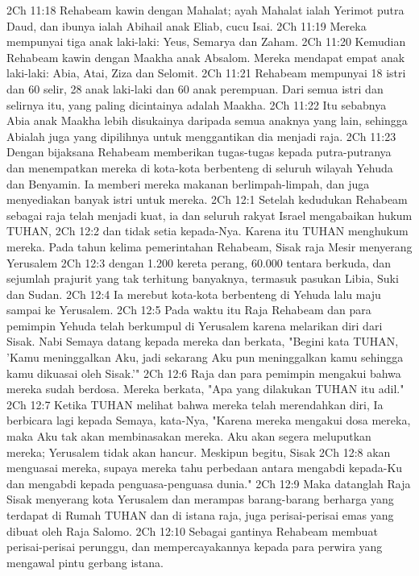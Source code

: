 2Ch 11:18  Rehabeam kawin dengan Mahalat; ayah Mahalat ialah Yerimot putra Daud, dan ibunya ialah Abihail anak Eliab, cucu Isai.
2Ch 11:19  Mereka mempunyai tiga anak laki-laki: Yeus, Semarya dan Zaham.
2Ch 11:20  Kemudian Rehabeam kawin dengan Maakha anak Absalom. Mereka mendapat empat anak laki-laki: Abia, Atai, Ziza dan Selomit.
2Ch 11:21  Rehabeam mempunyai 18 istri dan 60 selir, 28 anak laki-laki dan 60 anak perempuan. Dari semua istri dan selirnya itu, yang paling dicintainya adalah Maakha.
2Ch 11:22  Itu sebabnya Abia anak Maakha lebih disukainya daripada semua anaknya yang lain, sehingga Abialah juga yang dipilihnya untuk menggantikan dia menjadi raja.
2Ch 11:23  Dengan bijaksana Rehabeam memberikan tugas-tugas kepada putra-putranya dan menempatkan mereka di kota-kota berbenteng di seluruh wilayah Yehuda dan Benyamin. Ia memberi mereka makanan berlimpah-limpah, dan juga menyediakan banyak istri untuk mereka.
2Ch 12:1  Setelah kedudukan Rehabeam sebagai raja telah menjadi kuat, ia dan seluruh rakyat Israel mengabaikan hukum TUHAN,
2Ch 12:2  dan tidak setia kepada-Nya. Karena itu TUHAN menghukum mereka. Pada tahun kelima pemerintahan Rehabeam, Sisak raja Mesir menyerang Yerusalem
2Ch 12:3  dengan 1.200 kereta perang, 60.000 tentara berkuda, dan sejumlah prajurit yang tak terhitung banyaknya, termasuk pasukan Libia, Suki dan Sudan.
2Ch 12:4  Ia merebut kota-kota berbenteng di Yehuda lalu maju sampai ke Yerusalem.
2Ch 12:5  Pada waktu itu Raja Rehabeam dan para pemimpin Yehuda telah berkumpul di Yerusalem karena melarikan diri dari Sisak. Nabi Semaya datang kepada mereka dan berkata, "Begini kata TUHAN, 'Kamu meninggalkan Aku, jadi sekarang Aku pun meninggalkan kamu sehingga kamu dikuasai oleh Sisak.'"
2Ch 12:6  Raja dan para pemimpin mengakui bahwa mereka sudah berdosa. Mereka berkata, "Apa yang dilakukan TUHAN itu adil."
2Ch 12:7  Ketika TUHAN melihat bahwa mereka telah merendahkan diri, Ia berbicara lagi kepada Semaya, kata-Nya, "Karena mereka mengakui dosa mereka, maka Aku tak akan membinasakan mereka. Aku akan segera meluputkan mereka; Yerusalem tidak akan hancur. Meskipun begitu, Sisak
2Ch 12:8  akan menguasai mereka, supaya mereka tahu perbedaan antara mengabdi kepada-Ku dan mengabdi kepada penguasa-penguasa dunia."
2Ch 12:9  Maka datanglah Raja Sisak menyerang kota Yerusalem dan merampas barang-barang berharga yang terdapat di Rumah TUHAN dan di istana raja, juga perisai-perisai emas yang dibuat oleh Raja Salomo.
2Ch 12:10  Sebagai gantinya Rehabeam membuat perisai-perisai perunggu, dan mempercayakannya kepada para perwira yang mengawal pintu gerbang istana.
